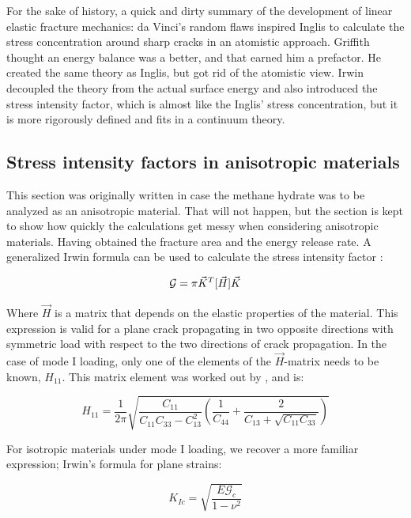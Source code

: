 For the sake of history, a quick and dirty summary of the development of linear elastic fracture mechanics: da Vinci's random flaws inspired Inglis to calculate the stress concentration around sharp cracks in an atomistic approach. Griffith thought an energy balance was a better, and that earned him a prefactor. He created the same theory as Inglis, but got rid of the atomistic view. Irwin decoupled the theory from the actual surface energy and also introduced the stress intensity factor, which is almost like the Inglis' stress concentration, but it is more rigorously defined and fits in a continuum theory.

\subsection{Stress intensity factors in anisotropic materials}
This section was originally written in case the methane hydrate was to be analyzed as an anisotropic material. That will not happen, but the section is kept to show how quickly the calculations get messy when considering anisotropic materials. Having obtained the fracture area and the energy release rate. A generalized Irwin formula can be used to calculate the stress intensity factor \cite{Laubie2014}:

\begin{equation}
	\mathbf{\mathcal{G}} = \pi \vec{K}^T [\vec{H}] \vec{K} 
\end{equation}


Where $\vec{H}$ is a matrix that depends on the elastic properties of the material. This expression is valid for a plane crack propagating in two opposite directions with symmetric load with respect to the two directions of crack propagation. In the case of mode I loading, only one of the elements of the $\vec{H}$-matrix needs to be known, $H_{11}$. This matrix element was worked out by \citet{Laubie2014}, and is:

\begin{equation}
	H_{11} = \frac{1}{2\pi} \sqrt{\frac{C_{11}}{C_{11}C_{33}-C^2_{13}}\left( \frac{1}{C_{44}} + \frac{2}{C_{13} + \sqrt{C_{11} C_{33}}}\right)}
\end{equation}

For isotropic materials under mode I loading, we recover a more familiar expression; Irwin's formula for plane strains:

\begin{equation}
	K_{Ic} = \sqrt{\frac{E\mathcal{G}_{c}}{1-\nu^2}}
	\label{eq:energy_release_to_stress_intensity_isotropic}
\end{equation}



